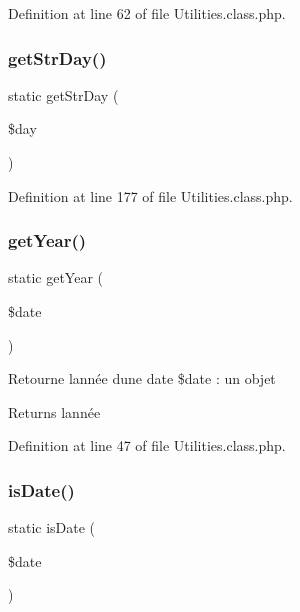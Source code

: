 Definition at line 62 of file Utilities.\+class.\+php.

\mbox{\label{class_utilities_aed4a7fe88d85a1b64ebca49b5b8c8aa9}} 
\subsubsection{\texorpdfstring{get\+Str\+Day()}{getStrDay()}}
{\footnotesize\ttfamily static get\+Str\+Day (\begin{DoxyParamCaption}\item[{}]{\$day }\end{DoxyParamCaption})\hspace{0.3cm}{\ttfamily [static]}}



Definition at line 177 of file Utilities.\+class.\+php.

\mbox{\label{class_utilities_a7d6905a273f76e42d3ae5021248d2ed0}} 
\subsubsection{\texorpdfstring{get\+Year()}{getYear()}}
{\footnotesize\ttfamily static get\+Year (\begin{DoxyParamCaption}\item[{}]{\$date }\end{DoxyParamCaption})\hspace{0.3cm}{\ttfamily [static]}}

Retourne l\textquotesingle{}année d\textquotesingle{}une date \$date \+: un objet  \begin{DoxyReturn}{Returns}
l\textquotesingle{}année 
\end{DoxyReturn}


Definition at line 47 of file Utilities.\+class.\+php.

\mbox{\label{class_utilities_a4151d2b42a0b24dd9fdf6bc3823e6bda}} 
\subsubsection{\texorpdfstring{is\+Date()}{isDate()}}
{\footnotesize\ttfamily static is\+Date (\begin{DoxyParamCaption}\item[{}]{\$date }\end{DoxyParamCaption})\hspace{0.3cm}{\ttfamily [static]}}


